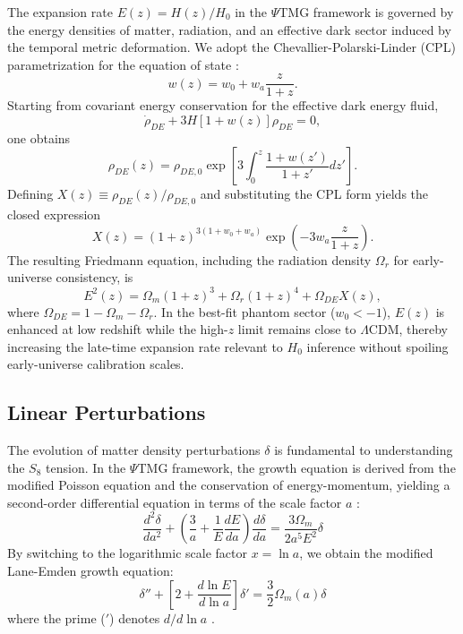 \documentclass[10pt,twocolumn,secnumarabic,amssymb, nobibnotes, aps, prd, floatfix]{revtex4-2}
\begin{document}
The expansion rate $E(z) = H(z)/H_0$ in the $\Psi$TMG framework is governed by the energy densities of matter, radiation, and an effective dark sector induced by the temporal metric deformation. We adopt the Chevallier-Polarski-Linder (CPL) parametrization for the equation of state \cite{CPL_Chevallier,CPL_Linder}:
\begin{equation}
w(z) = w_0 + w_a \frac{z}{1+z}.
\end{equation}
Starting from covariant energy conservation for the effective dark energy fluid,
\begin{equation}
\dot{\rho}_{DE} + 3H\left[1+w(z)\right]\rho_{DE}=0,
\end{equation}
one obtains
\begin{equation}
\rho_{DE}(z)=\rho_{DE,0}\exp\!\left[3\int_0^z\frac{1+w(z')}{1+z'}dz'\right].
\end{equation}
Defining $X(z)\equiv \rho_{DE}(z)/\rho_{DE,0}$ and substituting the CPL form yields the closed expression
\begin{equation}
X(z)=(1+z)^{3(1+w_0+w_a)}\exp\!\left(-3w_a\frac{z}{1+z}\right).
\end{equation}
The resulting Friedmann equation, including the radiation density $\Omega_r$ for early-universe consistency, is
\begin{equation}
E^2(z) = \Omega_m(1+z)^3 + \Omega_r(1+z)^4 + \Omega_{DE} X(z),
\end{equation}
where $\Omega_{DE} = 1 - \Omega_m - \Omega_r$. In the best-fit phantom sector ($w_0<-1$), $E(z)$ is enhanced at low redshift while the high-$z$ limit remains close to $\Lambda$CDM, thereby increasing the late-time expansion rate relevant to $H_0$ inference without spoiling early-universe calibration scales.

\subsection{Linear Perturbations}

The evolution of matter density perturbations $\delta$ is fundamental to understanding the $S_8$ tension. In the $\Psi$TMG framework, the growth equation is derived from the modified Poisson equation and the conservation of energy-momentum, yielding a second-order differential equation in terms of the scale factor $a$ \cite{Hu1996SmallScale}:
\begin{equation}
\frac{d^2\delta}{da^2} + \left( \frac{3}{a} + \frac{1}{E} \frac{dE}{da} \right) \frac{d\delta}{da} = \frac{3 \Omega_m}{2 a^5 E^2} \delta
\end{equation}
By switching to the logarithmic scale factor $x = \ln a$, we obtain the modified Lane-Emden growth equation:
\begin{equation}
\delta'' + \left[ 2 + \frac{d \ln E}{d \ln a} \right] \delta' = \frac{3}{2} \Omega_m(a) \delta
\end{equation}
where the prime ($'$) denotes $d/d\ln a$ \cite{Liddle2000Inflation}.
\end{document}
